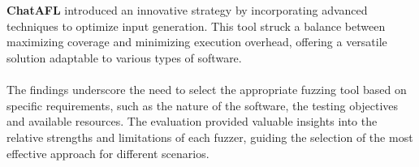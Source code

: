 \\\\\textbf{ChatAFL} introduced an innovative strategy by incorporating advanced techniques to optimize input generation. This tool struck a balance between maximizing coverage and minimizing execution overhead, offering a versatile solution adaptable to various types of software.
\\\\The findings underscore the need to select the appropriate fuzzing tool based on specific requirements, such as the nature of the software, the testing objectives and available resources. The evaluation provided valuable insights into the relative strengths and limitations of each fuzzer, guiding the selection of the most effective approach for different scenarios.
